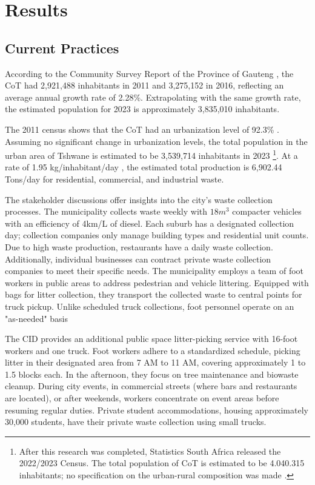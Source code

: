 \documentclass[authoryear,preprint,review,11pt,doubleblind]{elsarticle}
\begin{document}
    \section{Results}
    \subsection{Current Practices}
According to the Community Survey Report of the Province of Gauteng \citep{africaProvincialProfileGauteng2018}, the CoT had 2,921,488 inhabitants in 2011 and 3,275,152 in 2016, reflecting an average annual growth rate of 2.28\%. Extrapolating with the same growth rate, the estimated population for 2023 is approximately 3,835,010 inhabitants.

 The 2011 census shows that the CoT had an urbanization level of 92.3\% \citep{africaCensus20112012}. Assuming no significant change in urbanization levels, the total population in the urban area of Tshwane is estimated to be 3,539,714 inhabitants in 2023 \footnote{After this research was completed, Statistics South Africa released the 2022/2023 Census. The total population of CoT is estimated to be 4.040.315 inhabitants; no specification on the urban-rural composition was made \citep{statisticssouthafricaCensus202223}.
 }. At a rate of 1.95 kg/inhabitant/day \citep{tshwaneCityTshwane20222022}, the estimated total production is 6,902.44 Tons/day for residential, commercial, and industrial waste.

The stakeholder discussions offer insights into the city's waste collection processes. The municipality collects waste weekly with $18m^3$ compacter vehicles with an efficiency of 4km/L of diesel. Each suburb has a designated collection day; collection companies only manage building types and residential unit counts. Due to high waste production, restaurants have a daily waste collection. Additionally, individual businesses can contract private waste collection companies to meet their specific needs. The municipality employs a team of foot workers in public areas to address pedestrian and vehicle littering. Equipped with bags for litter collection, they transport the collected waste to central points for truck pickup. Unlike scheduled truck collections, foot personnel operate on an "as-needed" basis

The CID provides an additional public space litter-picking service with 16-foot workers and one truck. %
Foot workers adhere to a standardized schedule, picking litter in their designated area from 7 AM to 11 AM, covering approximately 1 to 1.5 blocks each. In the afternoon, they focus on tree maintenance and biowaste cleanup. During city events, in commercial streets (where bars and restaurants are located), or after weekends, workers concentrate on event areas before resuming regular duties. Private student accommodations, housing approximately 30,000 students, have their private waste collection using small trucks.
\end{document}
